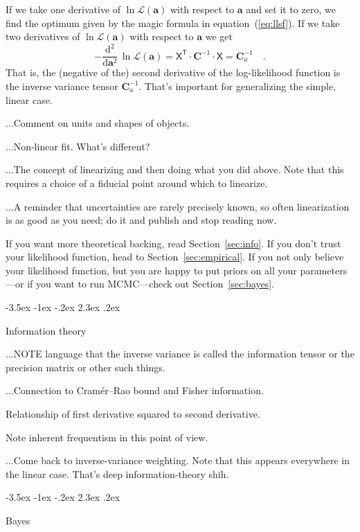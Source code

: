 \documentclass[10pt]{article}
\makeatletter
\newcommand{\sectionname}{Section}
\newcommand{\equationname}{equation}
\newcommand{\dd}{\mathrm{d}}
\newcommand{\T}{^{\!\mathsf{T}\!}}
\newcommand{\inv}{^{-1}}
\renewcommand{\vector}[1]{\boldsymbol{#1}}
\newcommand{\tensor}[1]{\mathbf{#1}}
\renewcommand{\matrix}[1]{\mathsf{#1}}
\newcommand{\like}{\mathscr{L}}
\newcommand{\va}{\vector{a}}
\newcommand{\tC}{\tensor{C}}
\newcommand{\mX}{\matrix{X}}
\renewcommand\section{\@startsection {section}{1}{\z@}%
  {-3.5ex \@plus -1ex \@minus -.2ex}%
  {2.3ex \@plus.2ex}%
  {\raggedright\normalfont\Large\bfseries}}
\makeatother
\begin{document}
If we take one derivative of $\ln\like(\va)$ with respect to $\va$ and set it
to zero, we find the optimum given by the magic formula in
\equationname~(\ref{eq:llsf}).
If we take two derivatives of $\ln\like(\va)$ with respect to $\va$ we get
\begin{equation}
  -\frac{\dd^2}{\dd\va^2}\,\ln\like(\va) = \mX\T\cdot\tC\inv\cdot\mX = \tC_a\inv
  \quad.
\end{equation}
That is, the (negative of the) second derivative of the log-likelihood function is
the inverse variance tensor $\tC_a\inv$.
That's important for generalizing the simple, linear case.

...Comment on units and shapes of objects.

...Non-linear fit. What's different?

...The concept of linearizing and then doing what you did above. Note that this
requires a choice of a fiducial point around which to linearize.

...A reminder that uncertainties are rarely precisely known, so often linearization
is as good as you need; do it and publish and stop reading now.

If you want more theoretical backing, read \sectionname~\ref{sec:info}. If you
don't trust your likelihood function, head to \sectionname~\ref{sec:empirical}.
If you not only believe your likelihood function, but you are happy to put priors
on all your parameters---or if you want to run MCMC---check
out \sectionname~\ref{sec:bayes}.

\section{Information theory}\label{sec:info}

...NOTE language that the inverse variance is called the information tensor or the precision matrix or other such things.

...Connection to Cram\'er--Rao bound and Fisher information.

Relationship of first derivative squared to second derivative.

Note inherent frequentism in this point of view.

...Come back to inverse-variance weighting. Note that this appears everywhere
in the linear case. That's deep information-theory shih.

\section{Bayes}\label{sec:bayes}
\end{document}
